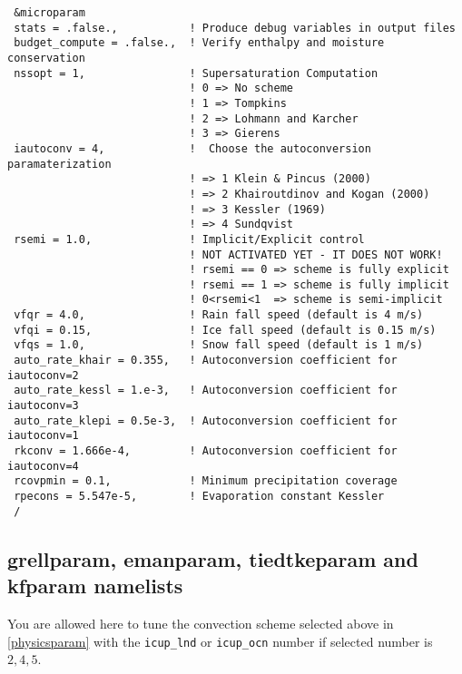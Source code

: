 {\footnotesize
\begin{Verbatim}
 &microparam
 stats = .false.,           ! Produce debug variables in output files
 budget_compute = .false.,  ! Verify enthalpy and moisture conservation
 nssopt = 1,                ! Supersaturation Computation
                            ! 0 => No scheme
                            ! 1 => Tompkins
                            ! 2 => Lohmann and Karcher
                            ! 3 => Gierens
 iautoconv = 4,             !  Choose the autoconversion paramaterization
                            ! => 1 Klein & Pincus (2000)
                            ! => 2 Khairoutdinov and Kogan (2000)
                            ! => 3 Kessler (1969)
                            ! => 4 Sundqvist
 rsemi = 1.0,               ! Implicit/Explicit control 
                            ! NOT ACTIVATED YET - IT DOES NOT WORK!
                            ! rsemi == 0 => scheme is fully explicit
                            ! rsemi == 1 => scheme is fully implicit
                            ! 0<rsemi<1  => scheme is semi-implicit
 vfqr = 4.0,                ! Rain fall speed (default is 4 m/s)
 vfqi = 0.15,               ! Ice fall speed (default is 0.15 m/s)
 vfqs = 1.0,                ! Snow fall speed (default is 1 m/s)
 auto_rate_khair = 0.355,   ! Autoconversion coefficient for iautoconv=2
 auto_rate_kessl = 1.e-3,   ! Autoconversion coefficient for iautoconv=3
 auto_rate_klepi = 0.5e-3,  ! Autoconversion coefficient for iautoconv=1
 rkconv = 1.666e-4,         ! Autoconversion coefficient for iautoconv=4
 rcovpmin = 0.1,            ! Minimum precipitation coverage
 rpecons = 5.547e-5,        ! Evaporation constant Kessler
 /
\end{Verbatim}
}

\subsection{grellparam, emanparam, tiedtkeparam and kfparam namelists}

You are allowed here to tune the convection scheme selected above in
\ref{physicsparam} with the \verb=icup_lnd= or \verb=icup_ocn= number if
selected number is $2, 4, 5$.


